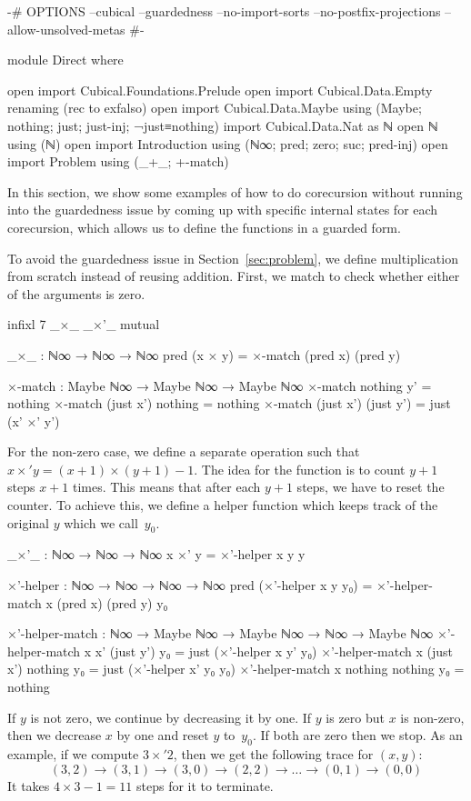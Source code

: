\begin{code}[hide]
{-# OPTIONS --cubical --guardedness --no-import-sorts --no-postfix-projections --allow-unsolved-metas #-}

module Direct where

open import Cubical.Foundations.Prelude
open import Cubical.Data.Empty
  renaming (rec to exfalso)
open import Cubical.Data.Maybe using (Maybe; nothing; just; just-inj; ¬just≡nothing)
import Cubical.Data.Nat as ℕ
open ℕ using (ℕ)
open import Introduction using (ℕ∞; pred; zero; suc; pred-inj)
open import Problem using (_+_; +-match)
\end{code}
In this section, we show some examples of how to do corecursion without running
into the guardedness issue by coming up with specific internal states for each
corecursion, which allows us to define the functions in a guarded form.

To avoid the guardedness issue in Section~\ref{sec:problem}, we define
multiplication from scratch instead of reusing addition. First, we match to
check whether either of the arguments is zero.
\begin{code}[hide]
infixl 7 _×_ _×'_
mutual
\end{code}
\begin{code}
  _×_ : ℕ∞ → ℕ∞ → ℕ∞
  pred (x × y) = ×-match (pred x) (pred y)

  ×-match : Maybe ℕ∞ → Maybe ℕ∞ → Maybe ℕ∞
  ×-match nothing    y'         = nothing
  ×-match (just x')  nothing    = nothing
  ×-match (just x')  (just y')  = just (x' ×' y')
\end{code}
For the non-zero case, we define a separate operation 
such that $x\times'y = (x+1)\times(y+1)-1$. The idea for the function is to
count $y+1$ steps $x+1$ times. This means that after each $y+1$ steps, we have
to reset the counter. To achieve this, we define a helper function which keeps
track of the original $y$ which we call~$y_0$.
\begin{code}
  _×'_ : ℕ∞ → ℕ∞ → ℕ∞
  x ×' y = ×'-helper x y y

  ×'-helper : ℕ∞ → ℕ∞ → ℕ∞ → ℕ∞
  pred (×'-helper x y y₀) =
    ×'-helper-match x (pred x) (pred y) y₀

  ×'-helper-match :
    ℕ∞ → Maybe ℕ∞ → Maybe ℕ∞ → ℕ∞ →
    Maybe ℕ∞
  ×'-helper-match x x' (just y') y₀ =
    just (×'-helper x y' y₀)
  ×'-helper-match x (just x') nothing y₀ =
    just (×'-helper x' y₀ y₀)
  ×'-helper-match x nothing nothing y₀ =
    nothing
\end{code}
If $y$ is not zero, we continue by decreasing it by one. If $y$ is zero but $x$
is non-zero, then we decrease $x$ by one and reset $y$ to~$y_0$. If both are
zero then we stop. As an example, if we compute $3 \times' 2$, then we get the
following trace for $(x, y)$:
\[
  (3,2) \to (3,1) \to (3,0) \to (2,2) \to \dots \to (0,1) \to (0,0)
\]
It takes $4 \times 3 - 1 = 11$ steps for it to terminate.

